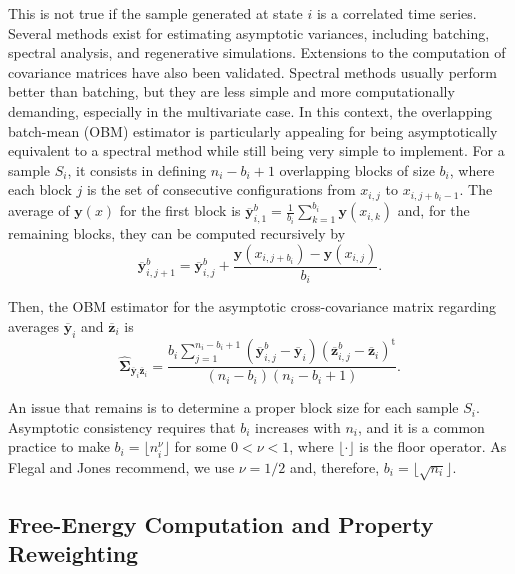 \documentclass[aip,jcp,reprint,amsmath,amssymb]{revtex4-1}
\newcommand{\mt}[1]{\boldsymbol{\mathbf{#1}}}           %
\newcommand{\vt}[1]{\boldsymbol{\mathbf{#1}}}           %
\newcommand{\tr}[1]{#1^\text{t}}                        %
\begin{document}
This is not true if the sample generated at state $i$ is a correlated time series. Several methods exist for estimating asymptotic variances, including batching, spectral analysis, and regenerative simulations.\cite{Geyer_1992, Alexopoulos_2006, Flegal_2010, Doss_2014} Extensions to the computation of covariance matrices have also been validated.\cite{Vats_2015, Vats_2017} Spectral methods usually perform better than batching,\cite{Flegal_2010} but they are less simple and more computationally demanding, especially in the multivariate case.\cite{Vats_2015} In this context, the overlapping batch-mean (OBM) estimator\cite{Meketon_1984} is particularly appealing for being asymptotically equivalent to a spectral method while still being very simple to implement. For a sample $S_i$, it consists in defining $n_i-b_i+1$ overlapping blocks of size $b_i$, where each block $j$ is the set of consecutive configurations from $x_{i,j}$ to $x_{i,j+b_i-1}$. The average of $\vt y(x)$ for the first block is ${\overline{\vt y}}^b_{i,1} = \frac{1}{b_i} \sum_{k=1}^{b_i} \vt y(x_{i,k})$ and, for the remaining blocks, they can be computed recursively by
\begin{equation*}
{\overline{\vt y}}^b_{i,j+1} = {\overline{\vt y}}^b_{i,j} + \frac{\vt y(x_{i,j+b_i}) - \vt y(x_{i,j})}{b_i}.
\end{equation*}

Then, the OBM estimator for the asymptotic cross-covariance matrix regarding averages $\overline{\vt y}_i$ and $\overline{\vt z}_i$ is\cite{Meketon_1984}
\begin{equation}
\label{eq:obm asymptotic covariance}
\hat{\mt \Sigma}_{\overline{\vt y}_i\overline{\vt z}_i} = \frac{b_i \sum\limits_{j=1}^{n_i - b_i + 1} ({\overline{\vt y}}^b_{i,j} - \overline{\vt y}_i) \tr{({\overline{\vt z}}^b_{i,j} - \overline{\vt z}_i)}}{(n_i - b_i)(n_i - b_i + 1)}.
\end{equation}

An issue that remains is to determine a proper block size for each sample $S_i$. Asymptotic consistency requires that $b_i$ increases with $n_i$, and it is a common practice to make $b_i = \lfloor n_i^\nu \rfloor$ for some $0 < \nu < 1$, where $\lfloor \cdot \rfloor$ is the floor operator. As Flegal and Jones\cite{Flegal_2010} recommend, we use $\nu = 1/2$ and, therefore, $b_i = \lfloor \sqrt{n_i} \rfloor$.

\subsection{Free-Energy Computation and Property Reweighting}
\end{document}
